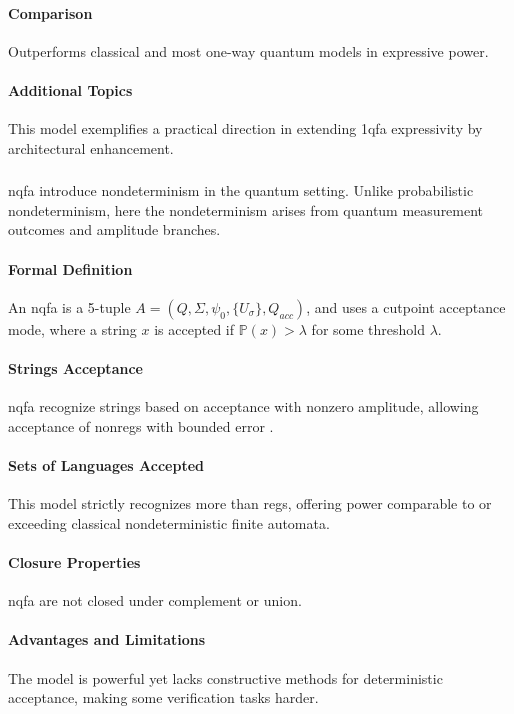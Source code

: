 \paragraph{Comparison}
Outperforms classical and most one-way quantum models in expressive power.

\paragraph{Additional Topics}
This model exemplifies a practical direction in extending \gls{1qfa} expressivity by architectural enhancement.

\subsubsection{}
\gls{nqfa} introduce nondeterminism in the quantum setting. Unlike probabilistic nondeterminism, here the nondeterminism arises from quantum measurement outcomes and amplitude branches.

\paragraph{Formal Definition}
An \gls{nqfa} is a 5-tuple \( A = (Q, \Sigma, \psi_0, \{U_\sigma\}, Q_{acc}) \), and uses a cutpoint acceptance mode, where a string \( x \) is accepted if \( \mathbb{P}(x) > \lambda \) for some threshold \( \lambda \).

\paragraph{Strings Acceptance}
\gls{nqfa} recognize strings based on acceptance with nonzero amplitude, allowing acceptance of non\glspl{reg} with bounded error \cite{yakaryilmaz2009languages}.

\paragraph{Sets of Languages Accepted}
This model strictly recognizes more than \glspl{reg}, offering power comparable to or exceeding classical nondeterministic finite automata.

\paragraph{Closure Properties}
\gls{nqfa} are not closed under complement or union.

\paragraph{Advantages and Limitations}
The model is powerful yet lacks constructive methods for deterministic acceptance, making some verification tasks harder.

